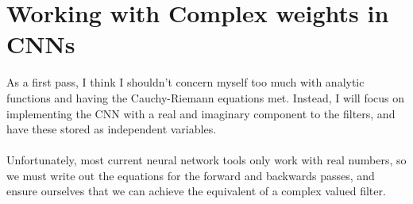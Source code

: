 





\section{Working with Complex weights in CNNs}\label{ch6:app:complex_weights}
  As a first pass, I think I shouldn't concern myself too much with analytic
  functions and having the Cauchy-Riemann equations met. Instead, I will focus
  on implementing the CNN with a real and imaginary component to the filters,
  and have these stored as independent variables.\\\\
  Unfortunately, most current neural network tools only work with real numbers,
  so we must write out the equations for the forward and backwards passes, and
  ensure ourselves that we can achieve the equivalent of a complex valued
  filter.

